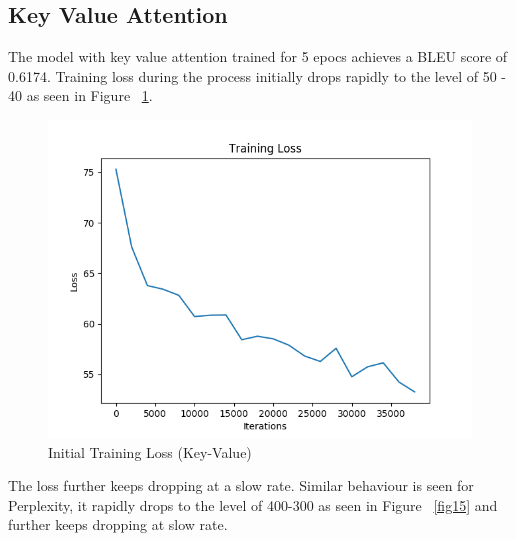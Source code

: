 \documentclass[11pt,a4paper]{article}
\begin{document}


\subsection{Key Value Attention}

The model with key value attention trained for 5 epocs achieves a BLEU score of 0.6174.
Training loss during the process initially drops rapidly to the level of 50 - 40 as seen in Figure ~\ref{fig13}. 

\begin{figure}[!htbp]
\includegraphics[width=\linewidth]{hi_key-value_loss_1.png}
\caption{Initial Training Loss (Key-Value)}
\label{fig13}
\end{figure}


The loss further keeps dropping at a slow rate. Similar behaviour is seen for Perplexity, it rapidly drops to the level of 400-300 as seen in Figure ~\ref{fig15} and further keeps dropping at slow rate.

\end{document}
